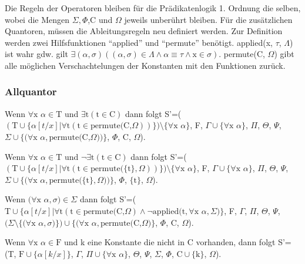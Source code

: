 Die Regeln der Operatoren bleiben für die Prädikatenlogik 1. Ordnung die selben, wobei die Mengen $\Sigma,\Phi$,C und $\Omega$ jeweils unberührt bleiben. Für die zusätzlichen Quantoren, müssen die Ableitungsregeln neu definiert werden. Zur Definition werden zwei Hilfsfunktionen ``applied'' und ``permute'' benötigt. applied(x, $\tau$, $\Lambda$) ist wahr gdw. gilt $\exists(\alpha,\sigma)((\alpha,\sigma)\in\Lambda\wedge\alpha\equiv\tau\wedge\textrm{x}\in\sigma)$. permute(C, $\Omega$) gibt alle möglichen Verschachtelungen der Konstanten mit den Funktionen zurück.

\subsubsection{Allquantor}
Wenn $\forall\textrm{x}$ $\alpha\in\textrm{T}$ und $\exists\textrm{t}(\textrm{t}\in\textrm{C})$ dann folgt S'=($(\textrm{T}\cup\lbrace\alpha[t/x]|\forall\textrm{t}(\textrm{t}\in\textrm{permute(C,}\Omega))\rbrace)\setminus\lbrace\forall\textrm{x}$ $\alpha\rbrace$, F, $\Gamma\cup\lbrace\forall\textrm{x}$ $\alpha\rbrace$, $\Pi$, $\Theta$, $\Psi$, $\Sigma\cup\lbrace(\forall\textrm{x}$ $\alpha,\textrm{permute(C,}\Omega))\rbrace$, $\Phi$, C, $\Omega$).

Wenn $\forall\textrm{x}$ $\alpha\in\textrm{T}$ und $\neg\exists\textrm{t}(\textrm{t}\in\textrm{C})$ dann folgt S'=($(\textrm{T}\cup\lbrace\alpha[t/x]|\forall\textrm{t}(\textrm{t}\in\textrm{permute(}\lbrace\textrm{t}\rbrace,\Omega))\rbrace)\setminus\lbrace\forall\textrm{x}$ $\alpha\rbrace$, F, $\Gamma\cup\lbrace\forall\textrm{x}$ $\alpha\rbrace$, $\Pi$, $\Theta$, $\Psi$, $\Sigma\cup\lbrace(\forall\textrm{x}$ $\alpha,\textrm{permute(}\lbrace\textrm{t}\rbrace,\Omega))\rbrace$, $\Phi$, $\lbrace\textrm{t}\rbrace$, $\Omega$).

Wenn $(\forall\textrm{x}$ $\alpha, \sigma)\in\Sigma$ dann folgt S'=($\textrm{T}\cup\lbrace\alpha[t/x]|\forall\textrm{t}(\textrm{t}\in\textrm{permute(C,}\Omega)\wedge\neg\textrm{applied(t},\forall\textrm{x}$ $\alpha, \Sigma)\rbrace$, F, $\Gamma$, $\Pi$, $\Theta$, $\Psi$, $(\Sigma\setminus\lbrace(\forall\textrm{x}$ $\alpha, \sigma)\rbrace)\cup\lbrace(\forall\textrm{x}$ $\alpha,\textrm{permute(C,}\Omega)\rbrace$, $\Phi$, C, $\Omega$).

Wenn $\forall\textrm{x}$ $\alpha\in\textrm{F}$ und k eine Konstante die nicht in C vorhanden, dann folgt S'=(T, $\textrm{F}\cup\lbrace\alpha[k/x]\rbrace$, $\Gamma$, $\Pi\cup\lbrace\forall\textrm{x}$ $\alpha\rbrace$, $\Theta$, $\Psi$, $\Sigma$, $\Phi$, $\textrm{C}\cup\lbrace\textrm{k}\rbrace$, $\Omega$).

